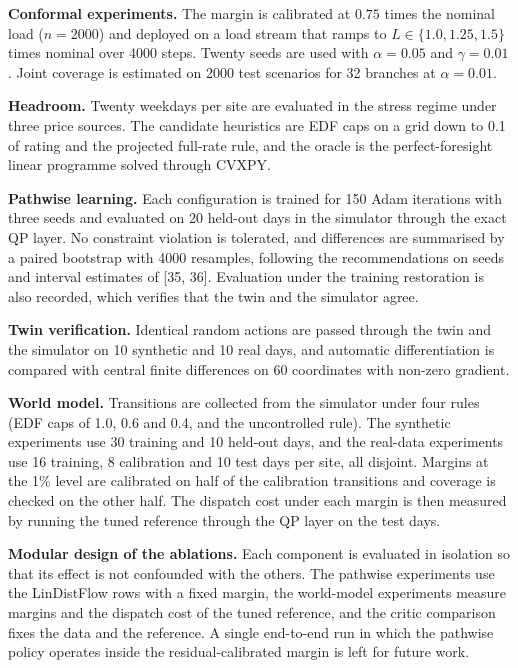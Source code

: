 \documentclass[11pt]{article}
\begin{document}
\textbf{Conformal experiments.} The margin is calibrated at $0.75$ times the nominal load ($n=2000$) and deployed on a load stream that ramps to $L\in\{1.0,1.25,1.5\}$ times nominal over 4000 steps. Twenty seeds are used with $\alpha=0.05$ and $\gamma=0.01$. Joint coverage is estimated on 2000 test scenarios for 32 branches at $\alpha=0.01$.

\textbf{Headroom.} Twenty weekdays per site are evaluated in the stress regime under three price sources. The candidate heuristics are EDF caps on a grid down to 0.1 of rating and the projected full-rate rule, and the oracle is the perfect-foresight linear programme solved through CVXPY.

\textbf{Pathwise learning.} Each configuration is trained for 150 Adam iterations with three seeds and evaluated on 20 held-out days in the simulator through the exact QP layer. No constraint violation is tolerated, and differences are summarised by a paired bootstrap with 4000 resamples, following the recommendations on seeds and interval estimates of [35, 36]. Evaluation under the training restoration is also recorded, which verifies that the twin and the simulator agree.

\textbf{Twin verification.} Identical random actions are passed through the twin and the simulator on 10 synthetic and 10 real days, and automatic differentiation is compared with central finite differences on 60 coordinates with non-zero gradient.

\textbf{World model.} Transitions are collected from the simulator under four rules (EDF caps of 1.0, 0.6 and 0.4, and the uncontrolled rule). The synthetic experiments use 30 training and 10 held-out days, and the real-data experiments use 16 training, 8 calibration and 10 test days per site, all disjoint. Margins at the 1\% level are calibrated on half of the calibration transitions and coverage is checked on the other half. The dispatch cost under each margin is then measured by running the tuned reference through the QP layer on the test days.

\textbf{Modular design of the ablations.} Each component is evaluated in isolation so that its effect is not confounded with the others. The pathwise experiments use the LinDistFlow rows with a fixed margin, the world-model experiments measure margins and the dispatch cost of the tuned reference, and the critic comparison fixes the data and the reference. A single end-to-end run in which the pathwise policy operates inside the residual-calibrated margin is left for future work.
\end{document}
